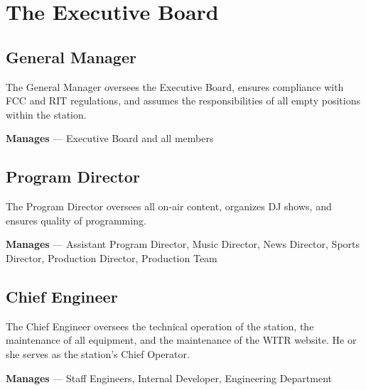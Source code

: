 \documentclass{witrman}
\begin{document}
\section{The Executive Board}
\subsection{General Manager}
The General Manager oversees the Executive Board, ensures compliance with FCC
and RIT regulations, and assumes the responsibilities of all empty positions
within the station.


\textbf{Manages} --- Executive Board and all members

\subsection{Program Director}
The Program Director oversees all on-air content, organizes DJ shows, and
ensures quality of programming.

\textbf{Manages} --- Assistant Program Director, Music Director, News Director,
Sports Director, Production Director, Production Team

\subsection{Chief Engineer}
The Chief Engineer oversees the technical operation of the station, the
maintenance of all equipment, and the maintenance of the WITR website. He or she
serves as the station’s Chief Operator.

\textbf{Manages} --- Staff Engineers, Internal Developer, Engineering Department
\end{document}
